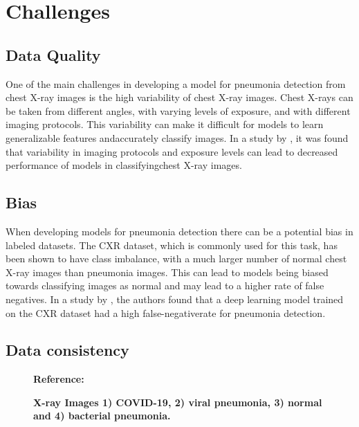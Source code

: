 \section{Challenges}

\subsection{Data Quality}

One of the main challenges in developing a model for pneumonia detection from chest X-ray images is the high variability of chest X-ray images. Chest X-rays can be taken from different angles, with varying levels of exposure, and with different imaging protocols. This variability can make it difficult for models to learn generalizable features andaccurately classify images. In a study by \cite{Wang:2017}, it was found that variability in imaging protocols and exposure levels can lead to decreased performance of models in classifyingchest X-ray images.\\

\subsection{Bias}
When developing models for pneumonia detection there can be a potential bias in labeled datasets. The CXR dataset, which is commonly used for this task, has been shown to have class imbalance, with a much larger number of normal chest X-ray images than pneumonia images. This can lead to models being biased towards classifying images as normal and may lead to a higher rate of false negatives. In a study by \cite{Ibrahim:2021}, the authors found that a deep learning model trained on the CXR dataset had a high false-negativerate for pneumonia detection.\\

\subsection{Data consistency}

\begin{figure}
	\centering
	\caption{\textbf{X-ray Images 1) COVID-19, 2) viral pneumonia, 3) normal and 4) bacterial pneumonia.}}
	\footnotesize \textbf{Reference:}\cite{Lim:2022}
	\label{fig:X-ray images of different lung disorders}
\end{figure}


